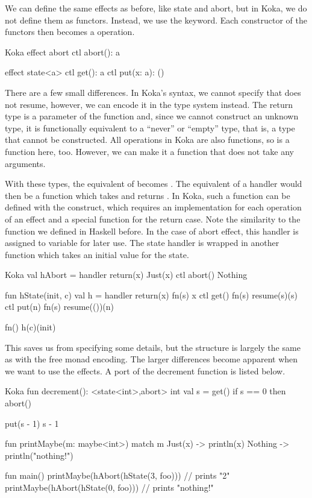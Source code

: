 We can define the same effects as before, like state and abort, but in Koka, we do not define them as functors. Instead, we use the  keyword. Each constructor of the functors then becomes a  operation.

\begin{lst}{Koka}
effect abort
  ctl abort(): a

effect state<a>
  ctl get(): a
  ctl put(x: a): ()
\end{lst}

There are a few small differences. In Koka's syntax, we cannot specify that  does not resume, however, we can encode it in the type system instead. The return type  is a parameter of the function and, since we cannot construct an unknown type, it is functionally equivalent to a ``never'' or ``empty'' type, that is, a type that cannot be constructed. All operations in Koka are also functions, so  is a function here, too. However, we can make it a function that does not take any arguments.

With these types, the equivalent of  becomes . The equivalent of a handler would then be a function which takes  and returns . In Koka, such a function can be defined with the  construct, which requires an implementation for each operation of an effect and a special function for the return case. Note the similarity to the  function we defined in Haskell before. In the case of abort effect, this handler is assigned to variable for later use. The state handler is wrapped in another function which takes an initial value for the state.

\begin{lst}{Koka}
val hAbort = handler
  return(x)   Just(x)
  ctl abort() Nothing

fun hState(init, c)
  val h = handler
    return(x)  fn(s) x
    ctl get()  fn(s) resume(s)(s)
    ctl put(n) fn(s) resume(())(n)

  fn() h(c)(init)
\end{lst}

This saves us from specifying some details, but the structure is largely the same as with the free monad encoding. The larger differences become apparent when we want to use the effects. A port of the decrement function is listed below.

\begin{lst}{Koka}
fun decrement(): <state<int>,abort> int
  val s = get()
  if s == 0 then
    abort()
  
  put(s - 1)
  s - 1 

fun printMaybe(m: maybe<int>)
  match m
    Just(x) -> println(x)
    Nothing -> println("nothing!")

fun main()
  printMaybe(hAbort(hState(3, foo))) // prints "2"
  printMaybe(hAbort(hState(0, foo))) // prints "nothing!"
\end{lst}


